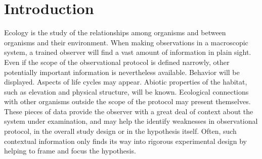\section{Introduction}

Ecology is the study of the relationships among organisms and between organisms and their environment. When making observations in a macroscopic system, a trained observer will find a vast amount of information in plain sight. Even if the scope of the observational protocol is defined narrowly, other potentially important information is nevertheless available. Behavior will be displayed. Aspects of life cycles may appear. Abiotic properties of the habitat, such as elevation and physical structure, will be known. Ecological connections with other organisms outside the scope of the protocol may present themselves. These pieces of data provide the observer with a great deal of context about the system under examination, and may help the identify weaknesses in observational protocol, in the overall study design or in the hypothesis itself. Often, such contextual information only finds its way into rigorous experimental design by helping to frame and focus the hypothesis. 





